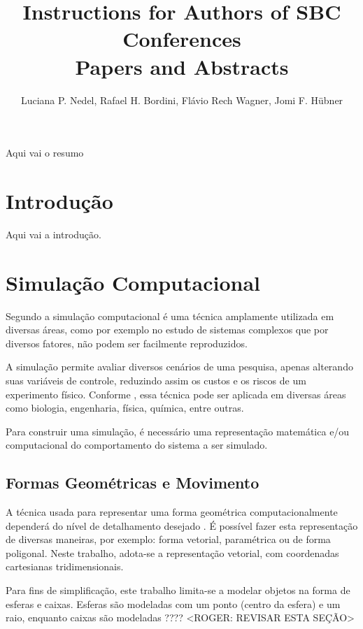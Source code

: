 \documentclass[12pt]{article}
\title{Instructions for Authors of SBC Conferences\\ Papers and Abstracts}
\author{Luciana P. Nedel\inst{1}, Rafael H. Bordini\inst{2}, Flávio Rech
  Wagner\inst{1}, Jomi F. Hübner\inst{3} }
\begin{document}
 

\maketitle

\begin{abstract}
\end{abstract}
     
\begin{resumo} 
  Aqui vai o resumo
\end{resumo}

\section{Introdução}
Aqui vai a introdução.

\section{Simulação Computacional}

Segundo \cite{duran2018computer} a simulação computacional é uma técnica amplamente utilizada em diversas áreas, como por exemplo no estudo de sistemas complexos que por diversos fatores, não podem ser facilmente reproduzidos.

A simulação permite avaliar diversos cenários de uma pesquisa, apenas alterando suas variáveis de controle, reduzindo assim os custos e os riscos de um experimento físico. Conforme \cite{marschner2018}, essa técnica pode ser aplicada em diversas áreas como biologia, engenharia, física, química, entre outras.

Para construir uma simulação, é necessário uma representação matemática e/ou computacional do comportamento do sistema a ser simulado.

\subsection{Formas Geométricas e Movimento}
A técnica usada para representar uma forma geométrica computacionalmente dependerá do nível de detalhamento desejado \cite{pharr2016}. É possível fazer esta representação de diversas maneiras, por exemplo: forma vetorial, paramétrica ou de forma poligonal. Neste trabalho, adota-se a representação vetorial, com coordenadas cartesianas tridimensionais.

Para fins de simplificação, este trabalho limita-se a modelar objetos na forma de esferas e caixas. Esferas são modeladas com um ponto (centro da esfera) e um raio, enquanto caixas são modeladas ???? <ROGER: REVISAR ESTA SEÇÃO>  
\end{document}
